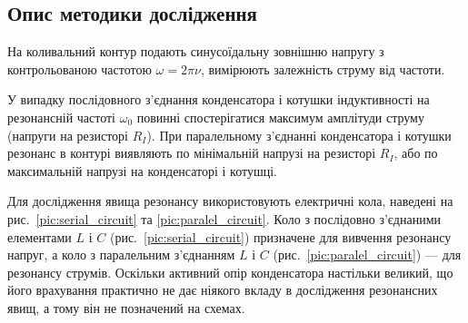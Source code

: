 


\subsection{Опис методики дослідження}


На коливальний контур подають синусоїдальну зовнішню напругу з контрольованою частотою $\omega = 2\pi \nu$, вимірюють залежність струму від частоти.

У випадку послідовного з'єднання конденсатора і котушки індуктивності на резонансній частоті $\omega_0$ повинні спостерігатися максимум амплітуди струму (напруги на резисторі $R_I$). При паралельному з'єднанні конденсатора і котушки резонанс в контурі виявляють по мінімальній напрузі на резисторі $R_I$, або по максимальній напрузі на конденсаторі і котушці.


Для дослідження явища резонансу використовують електричні кола, наведені на рис.~\ref{pic:serial_circuit} та \ref{pic:paralel_circuit}. Коло з послідовно з'єднаними елементами $L$ і $C$ (рис.~\ref{pic:serial_circuit}) призначене для вивчення резонансу напруг, а коло з паралельним з'єднанням  $L$ і $C$ (рис.~\ref{pic:paralel_circuit}) --- для резонансу струмів.  Оскільки активний опір конденсатора  настільки великий, що його врахування практично не дає ніякого вкладу в дослідження резонансних явищ, а тому він не позначений на схемах.

